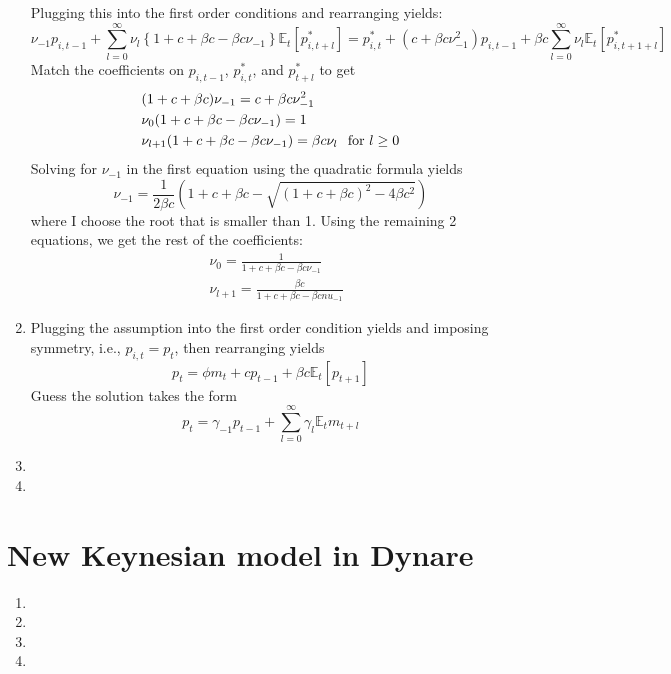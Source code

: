 \documentclass[11pt]{amsart}
\begin{document}
\begin{enumerate}[label = (\alph*)]
	Plugging this into the first order conditions and rearranging yields:
	\begin{dmath*}
		[1+c+\beta c] \nu_{-1} p_{i,t-1} + \sum_{l=0}^\infty \nu_l \left\lbrace 1+c+\beta c - \beta c \nu_{-1} \right\rbrace \mathbb{E}_t [p_{i,t+l}^*] = p_{i,t}^* + (c+\beta c \nu_{-1}^2) p_{i,t-1} + \beta c \sum_{l=0}^\infty  \nu_l \mathbb{E}_t [p_{i,t+1+l}^*]
	\end{dmath*}
	Match the coefficients on $p_{i,t-1}$, $p_{i,t}^*$, and $p_{t+l}^*$ to get
	\begin{align*}
		&(1 + c + \beta c) \nu_{-1} = c + \beta c \nu_{-1}^2 \\
		&\nu_0 (1 + c + \beta c - \beta c \nu_{-1}) = 1 \\
		&\nu_{l+1} (1 + c + \beta c - \beta c \nu_{-1}) = \beta c \nu_l \hspace{0.1in} \text{for $l \geq 0$}
	\end{align*}
	Solving for $\nu_{-1}$ in the first equation using the quadratic formula yields
	\begin{equation*}
		\nu_{-1} = \frac{1}{2 \beta c} \left(1 + c + \beta c - \sqrt{(1 + c + \beta c)^2 - 4 \beta c ^2} \right)
	\end{equation*}
	where I choose the root that is smaller than 1. Using the remaining 2 equations, we get the rest of the coefficients:
	\begin{align*}
		&\nu_0 = \frac{1}{1 + c + \beta c - \beta c \nu_{-1}} \\
		&\nu_{l+1} = \frac{\beta c}{1 + c + \beta c - \beta c nu_{-1}}
	\end{align*}

	\item
	Plugging the assumption into the first order condition yields and imposing symmetry, i.e., $p_{i,t} = p_t$, then rearranging yields
	\begin{equation*}
		[c + \beta c + \phi)] p_t = \phi m_t + c p_{t-1} + \beta c \mathbb{E}_t [p_{t+1}] 
	\end{equation*}
	Guess the solution takes the form
	\begin{equation*}
		p_t = \gamma_{-1} p_{t-1} + \sum_{l=0}^\infty \gamma_l \mathbb{E}_t m_{t+l}
	\end{equation*}
	\item 
	\item
\end{enumerate}
\section{New Keynesian model in Dynare}
\begin{enumerate}[label = (\alph*)]
	\item 
	\item 
	\item 
	\item 
\end{enumerate}
\end{document}
